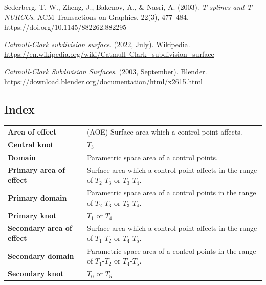 \documentclass{article}
\begin{document}
\vspace{12pt}

Sederberg, T. W., Zheng, J., Bakenov, A., $\&$ Nasri, A. (2003). \emph{T-splines and T-NURCCs}. ACM Transactions on Graphics, 22(3), 477–484. https://doi.org/10.1145/882262.882295

\vspace{12pt}

\emph{Catmull-Clark subdivision surface}. (2022, July). Wikipedia. \url{https://en.wikipedia.org/wiki/Catmull–Clark_subdivision_surface}

\vspace{12pt}

\emph{Catmull-Clark Subdivision Surfaces}. (2003, September). Blender. \url{https://download.blender.org/documentation/html/x2615.html}

\vspace{12pt}

\begin{large}
\section{Index}
\end{large}

\vspace{12pt}

\begin{table}[H]
\centering
\begin{tabular}{L{4cm} L{10cm}}
\hline
\textbf{Area of effect} & (AOE) Surface area which a control point affects.  \\
\textbf{Central knot} & $T_3$  \\
\textbf{Domain} & Parametric space area of a control points.  \\
\textbf{Primary area of effect} & Surface area which a control point affects in the range of $T_2$-$T_3$ or $T_3$-$T_4$.  \\
\textbf{Primary domain} & Parametric space area of a control points in the range of $T_2$-$T_3$ or $T_3$-$T_4$.  \\
\textbf{Primary knot} & $T_1$ or $T_4$  \\
\textbf{Secondary area of effect} & Surface area which a control point affects in the range of $T_1$-$T_2$ or $T_4$-$T_5$.  \\
\textbf{Secondary domain} & Parametric space area of a control points in the range of $T_1$-$T_2$ or $T_4$-$T_5$.  \\
\textbf{Secondary knot} & $T_0$ or $T_5$  \\
\hline
\end{tabular}
\end{table}











\newpage
\end{document}
